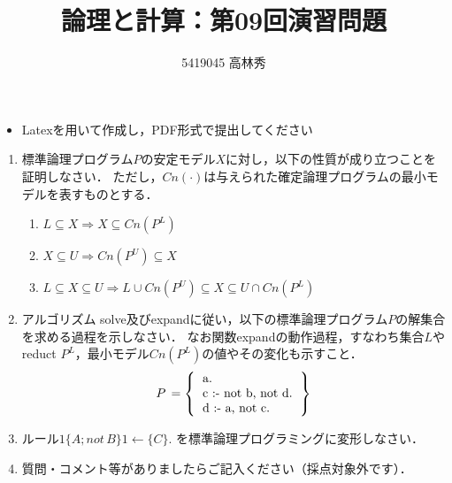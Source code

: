 \documentclass[dvipdfmx]{jsarticle}
\def\NO{09}
\def\LECTURENAME{論理と計算}
\begin{document}
\title{\LECTURENAME{}：第\NO{}回演習問題}

\author{5419045 高林秀}

\date{}
\maketitle

\begin{itemize}
\item Latexを用いて作成し，PDF形式で提出してください
\end{itemize}


\vspace*{\baselineskip}

\begin{enumerate}\setlength{\itemsep}{\baselineskip}

\item 標準論理プログラム$P$の安定モデル$X$に対し，以下の性質が成り立つことを証明しなさい．
  ただし，$Cn(\cdot)$は与えられた確定論理プログラムの最小モデルを表すものとする．
  \begin{enumerate}
  \item $L\subseteq X \Rightarrow X\subseteq Cn(P^L)$
  \item $X\subseteq U \Rightarrow Cn(P^U)\subseteq X$
  \item $L\subseteq X\subseteq U \Rightarrow  L\cup Cn(P^U)\subseteq X\subseteq U\cap Cn(P^L)$
  \end{enumerate}


\item アルゴリズム solve及びexpandに従い，以下の標準論理プログラム$P$の解集合を求める過程を示しなさい．
  なお関数expandの動作過程，すなわち集合$L$やreduct $P^L$，最小モデル$Cn(P^L)$の値やその変化も示すこと．
  \[
  P\,=\left\{
  \begin{tabular}{l}
    a.\\
    c :- not b, not d.\\
    d :- a, not c.\\
  \end{tabular}
  \right\}
  \]

\item ルール$1\{A ; not\,B\}1\leftarrow \{ C \}.$ を標準論理プログラミングに変形しなさい．

\item 質問・コメント等がありましたらご記入ください（採点対象外です）．
\end{enumerate}
\end{document}
